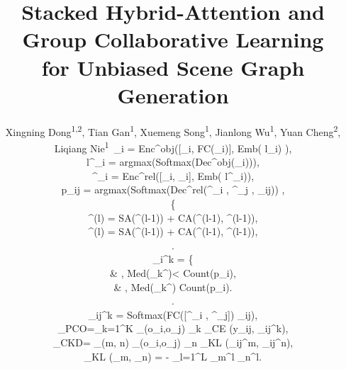 \documentclass[10pt,twocolumn,letterpaper]{article}
\begin{document}
\title{Stacked Hybrid-Attention and Group Collaborative Learning\\
for Unbiased Scene Graph Generation}

\author{Xingning Dong\textsuperscript{\rm 1,\rm 2}, \quad Tian Gan\textsuperscript{\rm 1}{\footnotemark[2]}, \quad Xuemeng Song\textsuperscript{\rm 1}, \quad Jianlong Wu\textsuperscript{\rm 1}, \quad Yuan Cheng\textsuperscript{\rm 2}{\footnotemark[2]}, \quad Liqiang Nie\textsuperscript{\rm 1}\
	_i = {Enc}^{obj}([_i, FC(_i)], Emb( {l}_i) ),

	{l}^{\prime}_i = {\rm argmax}({\rm Softmax}(Dec^{obj}(_i))),

	^{\prime}_i = {Enc}^{rel}([_i, _i], Emb( {l}^{\prime}_i)),

	{p}_{i\rightarrow j} = {\rm argmax}({\rm Softmax}({Dec}^{rel}(^{\prime}_i , ^{\prime}_j , _{ij})) ,

    \left \{
    \begin{aligned}
	^{(l)} = SA(^{(l-1)}) + CA(^{(l-1)}, ^{(l-1)}),
	\\
	^{(l)} = SA(^{(l-1)}) + CA(^{(l-1)}, ^{(l-1)}),
	\end{aligned}
	\right.

    \phi_{i}^{k} = 
	\left\{
	\begin{aligned}
		& ,\quad {}\;\; Med({}_{k}^{\prime})< Count({p}_{i}),
		\\
		&{ \quad\; \;\;\;\quad } ,  \quad {}\;\; Med({}_{k}^{\prime}) \geq Count({p}_{i}).
	\end{aligned}
	\right.

    _{ij}^{k} = {\rm Softmax}(FC([^{\prime}_i , ^{\prime}_j]) \otimes {}_{ij}),

	_{PCO}=\sum_{k=1}^{K} \sum_{{(o_i,o_j)} \in {}_k}  _{CE} ({y}_{ij}, _{ij}^{k}),

	_{CKD}= \sum_{{(m, n)} \in {}}   \sum_{{(o_i,o_j)} \in {}_n}  _{KL} (_{ij}^{m}, _{ij}^{{n}}),

	_{KL} (_{m}, _{n}) = - \sum_{l=1}^{L} _{m}^{l} \log {}_{n}^{l}.

}
\end{document}
